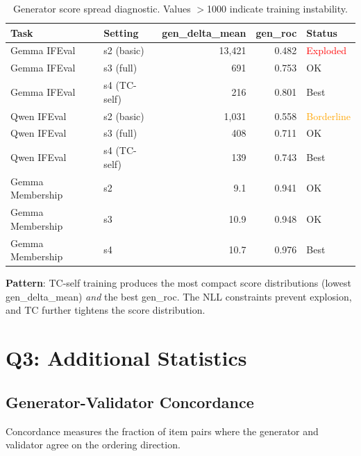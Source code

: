 \documentclass[11pt,a4paper]{article}
\begin{document}
\begin{table}[H]
\centering
\caption{Generator score spread diagnostic. Values $>$1000 indicate training instability.}
\label{tab:score_explosion}
\begin{tabular}{llrrl}
\toprule
\textbf{Task} & \textbf{Setting} & \textbf{gen\_delta\_mean} & \textbf{gen\_roc} & \textbf{Status} \\
\midrule
Gemma IFEval & s2 (basic) & 13,421 & 0.482 & \textcolor{red}{Exploded} \\
Gemma IFEval & s3 (full) & 691 & 0.753 & OK \\
Gemma IFEval & s4 (TC-self) & 216 & 0.801 & Best \\
\midrule
Qwen IFEval & s2 (basic) & 1,031 & 0.558 & \textcolor{orange}{Borderline} \\
Qwen IFEval & s3 (full) & 408 & 0.711 & OK \\
Qwen IFEval & s4 (TC-self) & 139 & 0.743 & Best \\
\midrule
Gemma Membership & s2 & 9.1 & 0.941 & OK \\
Gemma Membership & s3 & 10.9 & 0.948 & OK \\
Gemma Membership & s4 & 10.7 & 0.976 & Best \\
\bottomrule
\end{tabular}
\end{table}

\textbf{Pattern}: TC-self training produces the most compact score distributions (lowest gen\_delta\_mean) \emph{and} the best gen\_roc. The NLL constraints prevent explosion, and TC further tightens the score distribution.

\section{Q3: Additional Statistics}

\subsection{Generator-Validator Concordance}

Concordance measures the fraction of item pairs where the generator and validator agree on the ordering direction.
\end{document}
